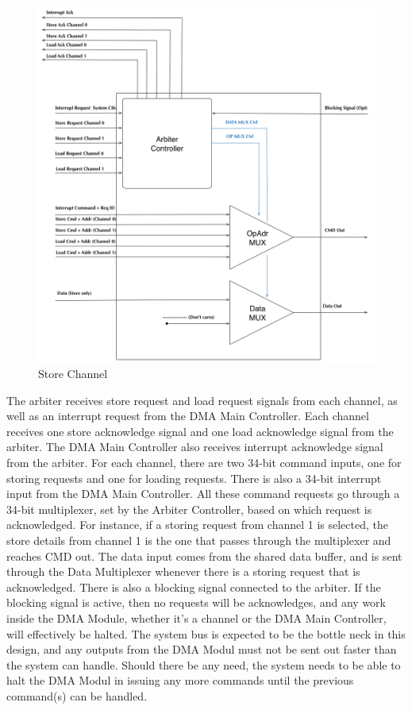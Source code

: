 \begin{figure}[h!]
    \centering
    \includegraphics[width=1.0\textwidth]{Figures/DMA/Arbiter}
    \caption{Store Channel}
    \label{fig:arbiter}
\end{figure}

The arbiter receives store request and load request signals from each channel, as well as an interrupt request from the DMA Main Controller.
Each channel receives one store acknowledge signal and one load acknowledge signal from the arbiter.
The DMA Main Controller also receives interrupt acknowledge signal from the arbiter.
For each channel, there are two 34-bit command inputs, one for storing requests and one for loading requests.
There is also a 34-bit interrupt input from the DMA Main Controller.
All these command requests go through a 34-bit multiplexer, set by the Arbiter Controller, based on which request is acknowledged.
For instance, if a storing request from channel 1 is selected, the store details from channel 1 is the one that passes through the multiplexer and reaches CMD out.
The data input comes from the shared data buffer, and is sent through the Data Multiplexer whenever there is a storing request that is acknowledged.
There is also a blocking signal connected to the arbiter.
If the blocking signal is active, then no requests will be acknowledges, and any work inside the DMA Module, whether it's a channel or the DMA Main Controller, will effectively be halted.
The system bus is expected to be the bottle neck in this design, and any outputs from the DMA Modul must not be sent out faster than the system can handle.
Should there be any need, the system needs to be able to halt the DMA Modul in issuing any more commands until the previous command(s) can be handled. 

